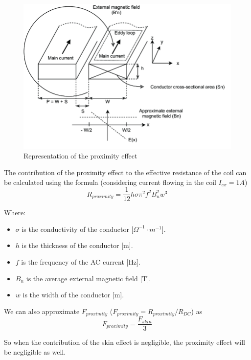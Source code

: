\begin{itemize}
    \begin{figure}[th]
        \centering
        \includegraphics[scale=0.4]{Chapters/Chapter2/Flexible_PCB_coils/Figures/proximity_effect.png}
        \caption[Proximity effect]{Representation of the proximity effect}
        \label{fig:Proximity effect}
    \end{figure}

    The contribution of the proximity effect to the effective resistance of the coil can be calculated using the formula (considering current flowing in the coil $I_{ex} = 1A$) \cite{AC_res_Optimization}
    \begin{equation}
        R_{proximity} = \frac{1}{12} h \sigma \pi^2 f^2 B_n^2 w^3
    \end{equation}
        
    Where:
    \begin{itemize}
        \item \( \sigma \) is the conductivity of the conductor [\(\Omega^{-1} \cdot m^{-1}\)].
        \item \( h \) is the thickness of the conductor [m].
        \item \( f \) is the frequency of the AC current [Hz].
        \item \( B_n \) is the average external magnetic field [T].
        \item \( w \) is the width of the conductor [m].
    \end{itemize}

    We can also approximate $F_{proximity}$ ($F_{proximity} = R_{proximity}/R_{DC}$) as
    \begin{equation}
        F_{proximity} = \frac{F_{skin}}{3}
    \end{equation}

    So when the contribution of the skin effect is negligible, the proximity effect will be negligible as well.

\end{itemize}





